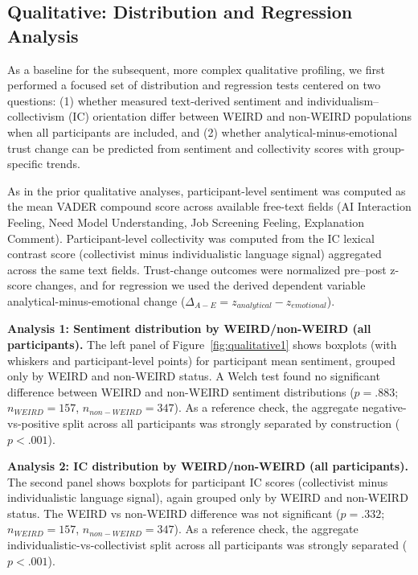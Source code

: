 \subsection{Qualitative: Distribution and Regression Analysis}

As a baseline for the subsequent, more complex qualitative profiling, we first performed a focused set of distribution and regression tests centered on two questions: (1) whether measured text-derived sentiment and individualism--collectivism (IC) orientation differ between WEIRD and non-WEIRD populations when all participants are included, and (2) whether analytical-minus-emotional trust change can be predicted from sentiment and collectivity scores with group-specific trends.

As in the prior qualitative analyses, participant-level sentiment was computed as the mean VADER compound score across available free-text fields (AI Interaction Feeling, Need Model Understanding, Job Screening Feeling, Explanation Comment). Participant-level collectivity was computed from the IC lexical contrast score (collectivist minus individualistic language signal) aggregated across the same text fields. Trust-change outcomes were normalized pre--post z-score changes, and for regression we used the derived dependent variable analytical-minus-emotional change ($\Delta_{A-E} = z_{analytical} - z_{emotional}$).

\textbf{Analysis 1: Sentiment distribution by WEIRD/non-WEIRD (all participants).} The left panel of Figure~\ref{fig:qualitative1} shows boxplots (with whiskers and participant-level points) for participant mean sentiment, grouped only by WEIRD and non-WEIRD status. A Welch test found no significant difference between WEIRD and non-WEIRD sentiment distributions ($p=.883$; $n_{WEIRD}=157$, $n_{non-WEIRD}=347$). As a reference check, the aggregate negative-vs-positive split across all participants was strongly separated by construction ($p<.001$).

\textbf{Analysis 2: IC distribution by WEIRD/non-WEIRD (all participants).} The second panel shows boxplots for participant IC scores (collectivist minus individualistic language signal), again grouped only by WEIRD and non-WEIRD status. The WEIRD vs non-WEIRD difference was not significant ($p=.332$; $n_{WEIRD}=157$, $n_{non-WEIRD}=347$). As a reference check, the aggregate individualistic-vs-collectivist split across all participants was strongly separated ($p<.001$).

